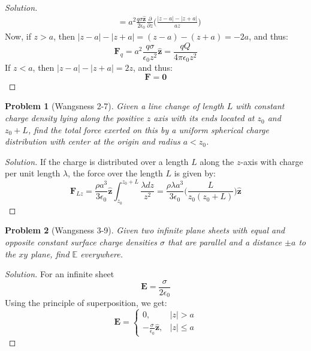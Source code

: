 \documentclass{article}
\theoremstyle{mystyle}
\newtheorem{problem}{Problem}[section]
\begin{document}
\begin{proof}[Solution]
\begin{align*}
    &= a^{2}\frac{q\sigma \hat{\mathbf{z}}}{2\epsilon_{0}} \frac{\partial}{\partial z}\bigg(\frac{|z-a|-|z+a|}{az}\bigg)
\end{align*}
Now, if $z>a$, then $|z-a|-|z+a| = (z-a)-(z+a) = -2a$, and thus:
\begin{equation*}
    \mathbf{F}_{q} = a^{2}\frac{q\sigma}{\epsilon_{0}z^{2}}\hat{\mathbf{z}} = \frac{qQ}{4\pi \epsilon_{0}z^{2}} \tag{$z>a$}
\end{equation*}
If $z<a$, then $|z-a|-|z+a| = 2z$, and thus:
\begin{equation*}
    \mathbf{F} = \mathbf{0} \tag{$z<a$}
\end{equation*}
\end{proof}
\begin{problem}[Wangsness 2-7]
Given a line change of length $L$ with constant charge density lying along the positive $z$ axis with its ends located at $z_{0}$ and $z_{0}+L$, find the total force exerted on this by a uniform spherical charge distribution with center at the origin and radius $a<z_{0}$.
\end{problem}
\begin{proof}[Solution]
If the charge is distributed over a length $L$ along the $z$-axis with charge per unit length $\lambda$, the force over the length $L$ is given by:
\begin{equation*}
    \mathbf{F}_{Lz} = \frac{\rho a^3}{3\epsilon_0}\hat{\mathbf{z}} \int_{z_0}^{z_0+L} \frac{\lambda dz}{z^2} = \frac{\rho \lambda a^3}{3\epsilon_0}\bigg(\frac{L}{z_0(z_0+L)}\bigg) \hat{\mathbf{z}}
\end{equation*}
\end{proof}
\begin{problem}[Wangsness 3-9]
Given two infinite plane sheets with equal and opposite constant surface charge densities $\sigma$ that are parallel and a distance $\pm a$ to the $xy$ plane, find $\mathbb{E}$ everywhere.
\end{problem}
\begin{proof}[Solution]
For an infinite sheet
\begin{equation*}
    \mathbf{E} = \frac{\sigma}{2\epsilon_0}    
\end{equation*}
Using the principle of superposition, we get:
\begin{equation*}
    \mathbf{E} = \begin{cases} 0, & |z|>a \\ -\frac{\sigma}{\epsilon_0}\hat{\mathbf{z}},& |z|\leq a\end{cases}
\end{equation*}
\end{proof}
\end{document}

